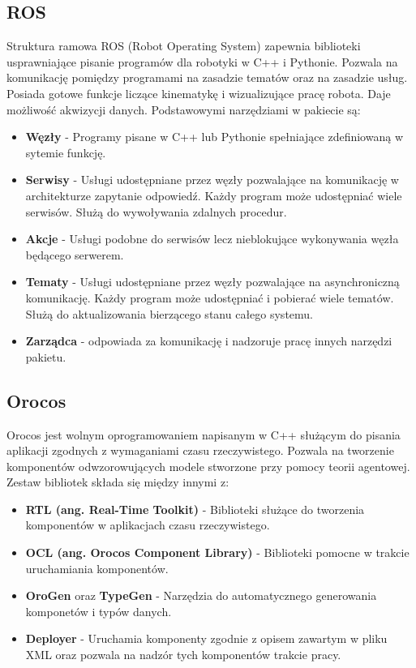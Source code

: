 	\subsection{ROS}
	Struktura ramowa ROS (Robot Operating System)\cite{bib:ROS} zapewnia biblioteki usprawniające pisanie programów dla robotyki w C++ i Pythonie. Pozwala na komunikację pomiędzy programami na zasadzie tematów oraz na zasadzie usług. Posiada gotowe funkcje liczące kinematykę i wizualizujące pracę robota. Daje możliwość akwizycji danych. Podstawowymi narzędziami w pakiecie są:
	\begin{itemize}
		\item \textbf{Węzły} - Programy pisane w C++ lub Pythonie spełniające zdefiniowaną w sytemie funkcję.
		\item \textbf{Serwisy} - Usługi udostępniane przez węzły pozwalające na komunikację w architekturze zapytanie odpowiedź. Każdy program może udostępniać wiele serwisów. Służą do wywoływania zdalnych procedur.
		\item \textbf{Akcje} - Usługi podobne do serwisów lecz nieblokujące wykonywania węzła będącego serwerem.
		\item \textbf{Tematy} - Usługi udostępniane przez węzły pozwalające na asynchroniczną komunikację. Każdy program może udostępniać i pobierać wiele tematów. Służą do aktualizowania bierzącego stanu całego systemu.
		\item \textbf{Zarządca} - odpowiada za komunikację i nadzoruje pracę innych narzędzi pakietu.
	\end{itemize}
	\subsection{Orocos}
	Orocos \cite{bib:Orocos}jest wolnym oprogramowaniem napisanym w C++ służącym do pisania aplikacji zgodnych z wymaganiami czasu rzeczywistego. Pozwala na tworzenie komponentów odwzorowujących modele stworzone przy pomocy teorii agentowej. Zestaw bibliotek składa się między innymi z:
	\begin{itemize}
		\item \textbf{RTL (ang. Real-Time Toolkit)} - Biblioteki służące do  tworzenia komponentów w aplikacjach czasu rzeczywistego.
		\item \textbf{OCL (ang. Orocos Component Library)} - Biblioteki pomocne w trakcie uruchamiania komponentów.
		\item \textbf{OroGen} oraz \textbf{TypeGen} - Narzędzia do automatycznego generowania komponetów i typów danych.
		\item \textbf{Deployer} - Uruchamia komponenty zgodnie z opisem zawartym w pliku XML oraz pozwala na nadzór tych komponentów trakcie pracy.
	\end{itemize}

